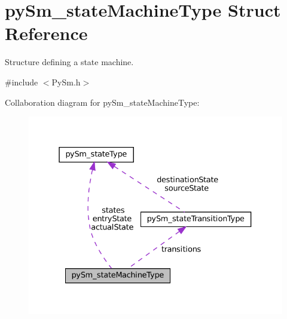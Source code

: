 \hypertarget{structpySm__stateMachineType}{}\section{py\+Sm\+\_\+state\+Machine\+Type Struct Reference}
\label{structpySm__stateMachineType}


Structure defining a state machine.  




{\ttfamily \#include $<$Py\+Sm.\+h$>$}



Collaboration diagram for py\+Sm\+\_\+state\+Machine\+Type\+:\nopagebreak
\begin{figure}[H]
\begin{center}
\leavevmode
\includegraphics[width=331pt]{structpySm__stateMachineType__coll__graph}
\end{center}
\end{figure}
